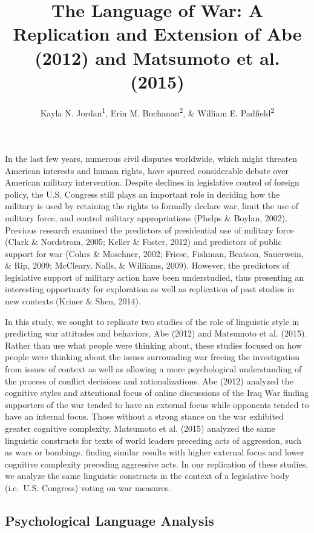 \documentclass[english,,man]{apa6}
\title{The Language of War: A Replication and Extension of Abe (2012) and Matsumoto et al. (2015)}
\author{Kayla N. Jordan\textsuperscript{1}, Erin M. Buchanan\textsuperscript{2}, \& William E. Padfield\textsuperscript{2}}
\date{}
\affiliation{
\vspace{0.5cm}
\textsuperscript{1} University of Texas - Austin\\\textsuperscript{2} Missouri State University}
\begin{document}
\maketitle

In the last few years, numerous civil disputes worldwide, which might threaten American interests and human rights, have spurred considerable debate over American military intervention. Despite declines in legislative control of foreign policy, the U.S. Congress still plays an important role in deciding how the military is used by retaining the rights to formally declare war, limit the use of military force, and control military appropriations (Phelps \& Boylan, 2002). Previous research examined the predictors of presidential use of military force (Clark \& Nordstrom, 2005; Keller \& Foster, 2012) and predictors of public support for war (Cohrs \& Moschner, 2002; Friese, Fishman, Beatson, Sauerwein, \& Rip, 2009; McCleary, Nalls, \& Williams, 2009). However, the predictors of legislative support of military action have been understudied, thus presenting an interesting opportunity for exploration as well as replication of past studies in new contexts (Kriner \& Shen, 2014).

In this study, we sought to replicate two studies of the role of linguistic style in predicting war attitudes and behaviors, Abe (2012) and Matsumoto et al. (2015). Rather than use what people were thinking about, these studies focused on how people were thinking about the issues surrounding war freeing the investigation from issues of context as well as allowing a more psychological understanding of the process of conflict decisions and rationalizations. Abe (2012) analyzed the cognitive styles and attentional focus of online discussions of the Iraq War finding supporters of the war tended to have an external focus while opponents tended to have an internal focus. Those without a strong stance on the war exhibited greater cognitive complexity. Matsumoto et al. (2015) analyzed the same linguistic constructs for texts of world leaders preceding acts of aggression, such as wars or bombings, finding similar results with higher external focus and lower cognitive complexity preceding aggressive acts. In our replication of these studies, we analyze the same linguistic constructs in the context of a legislative body (i.e.~U.S. Congress) voting on war measures.

\hypertarget{psychological-language-analysis}{%
\subsection{Psychological Language Analysis}\label{psychological-language-analysis}}
\end{document}
